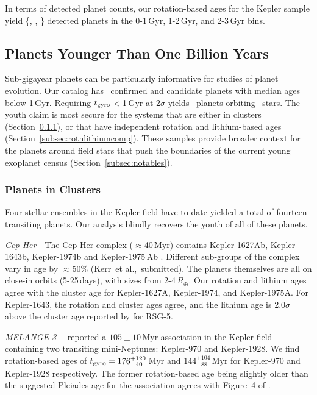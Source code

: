 \documentclass[11pt,twocolumn,tighten,linenumbers]{aastex63}
\begin{document}
In terms of detected planet counts, our rotation-based ages for the
Kepler sample yield \{\nplyounggyro, \nplmidgyro, \nploldgyro\}
detected planets in the 0-1\,Gyr, 1-2\,Gyr, and 2-3\,Gyr bins.  


\subsection{Planets Younger Than One Billion Years}

Sub-gigayear planets can be particularly informative for studies of
planet evolution.  Our catalog has \nplyounggyro\ confirmed and
candidate planets with median ages below 1\,Gyr.  Requiring $t_{\rm
gyro}$$<$1\,Gyr at 2$\sigma$ yields \nplyounggyrotwosigma\ planets
orbiting \nplhostsyounggyrotwosigma\ stars.  The youth claim is most
secure for the systems that are either in clusters (Section~\ref{subsec:clusterplanets}), or that have
independent rotation and lithium-based ages (Section~\ref{subsec:rotnlithiumcomp}).
These samples provide broader context for the planets around field
stars that push the boundaries of the current young exoplanet census
(Section~\ref{subsec:notables}).

\subsubsection{Planets in Clusters}
\label{subsec:clusterplanets}

Four stellar ensembles in the Kepler field have to date yielded a
total of fourteen transiting planets.  Our analysis blindly recovers
the youth of all of these planets.

{\it Cep-Her}---The Cep-Her complex ($\approx$40\,Myr) contains
Kepler-1627Ab, Kepler-1643b, Kepler-1974b and Kepler-1975\,Ab
\citep{Bouma_2022b,Bouma_2022a}.  Different sub-groups of the complex
vary in age by $\approx$50\% (Kerr~et al.,~submitted).  The planets
themselves are all on close-in orbits (5-25\,days), with sizes from
2-4\,$R_\oplus$.  Our rotation and lithium ages agree with the cluster
age for Kepler-1627A, Kepler-1974, and Kepler-1975A.  For Kepler-1643,
the rotation and cluster ages agree, and the lithium age is
2.0$\sigma$ above the cluster age reported by \citet{Bouma_2022b} for
RSG-5.

{\it MELANGE-3}---\citet{Barber_2022} reported a $105\pm10$\,Myr
association in the Kepler field containing two transiting
mini-Neptunes: Kepler-970 and Kepler-1928.  We find rotation-based
ages of $t_{\rm gyro}=176_{-40}^{+120}$\,Myr and
$144_{-88}^{+104}$\,Myr for Kepler-970 and Kepler-1928 respectively.
The former rotation-based age being slightly older than the suggested
Pleiades age for the association agrees with Figure~4 of
\citet{Barber_2022}.
\end{document}
